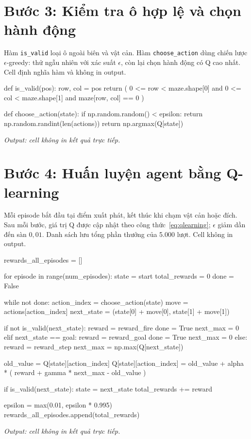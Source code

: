 \documentclass[12pt,a4paper]{report}
\begin{document}
\section{Bước 3: Kiểm tra ô hợp lệ và chọn hành động}
Hàm \texttt{is\_valid} loại ô ngoài biên và vật cản. Hàm \texttt{choose\_action} dùng chiến lược $\epsilon$-greedy: thử ngẫu nhiên với xác suất $\epsilon$, còn lại chọn hành động có Q cao nhất. Cell định nghĩa hàm và không in output.

\begin{Code}
def is_valid(pos):
    row, col = pos
    return (
        0 <= row < maze.shape[0]
        and 0 <= col < maze.shape[1]
        and maze[row, col] == 0
    )


def choose_action(state):
    if np.random.random() < epsilon:
        return np.random.randint(len(actions))
    return np.argmax(Q[state])
\end{Code}
\noindent\textit{Output: cell không in kết quả trực tiếp.}

\section{Bước 4: Huấn luyện agent bằng Q-learning}
Mỗi episode bắt đầu tại điểm xuất phát, kết thúc khi chạm vật cản hoặc đích. Sau mỗi bước, giá trị Q được cập nhật theo công thức~\eqref{eq:qlearning}; $\epsilon$ giảm dần đến sàn $0{,}01$. Danh sách  lưu tổng phần thưởng của 5.000 lượt. Cell không in output.

\begin{Code}
rewards_all_episodes = []

for episode in range(num_episodes):
    state = start
    total_rewards = 0
    done = False

    while not done:
        action_index = choose_action(state)
        move = actions[action_index]
        next_state = (state[0] + move[0], state[1] + move[1])

        if not is_valid(next_state):
            reward = reward_fire
            done = True
            next_max = 0
        elif next_state == goal:
            reward = reward_goal
            done = True
            next_max = 0
        else:
            reward = reward_step
            next_max = np.max(Q[next_state])

        old_value = Q[state][action_index]
        Q[state][action_index] = old_value + alpha * (
            reward + gamma * next_max - old_value
        )

        if is_valid(next_state):
            state = next_state
        total_rewards += reward

    epsilon = max(0.01, epsilon * 0.995)
    rewards_all_episodes.append(total_rewards)
\end{Code}
\noindent\textit{Output: cell không in kết quả trực tiếp.}
\end{document}
